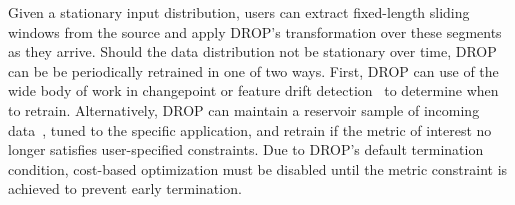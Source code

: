 



Given a stationary input distribution, users can extract fixed-length sliding windows from the source and apply DROP's transformation over these segments as they arrive. 
Should the data distribution not be stationary over time, DROP can be be periodically retrained in one of two ways. 
First, DROP can use of the wide body of work in changepoint or feature drift detection~\cite{cp1, cp2} to determine when to retrain. 
Alternatively, DROP can maintain a reservoir sample of incoming data~\cite{reservoir}, tuned to the specific application, and retrain if the metric of interest no longer satisfies user-specified constraints. 
Due to DROP's default termination condition, cost-based optimization must be disabled until the metric constraint is achieved to prevent early termination.




